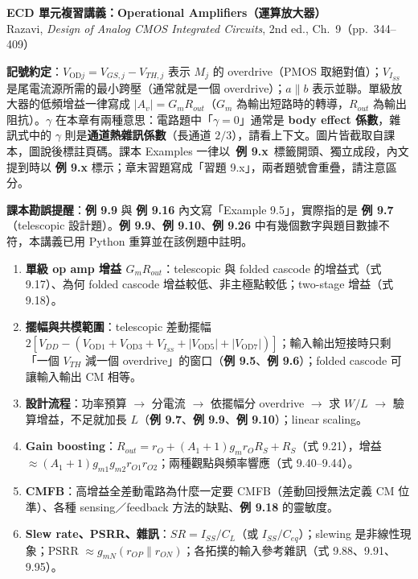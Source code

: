 \documentclass[11pt,a4paper]{article}
\newcommand{\pl}{\mathbin{\|}}
\newcommand{\OD}[1]{V_{\text{OD}#1}}
\newcommand{\extag}[1]{\colorbox{extagbg}{\textcolor{extag}{\sffamily\bfseries\,例 #1\,}}}
\newcommand{\exref}[1]{\textcolor{extag}{\textbf{\sffamily 例 #1}}}
\begin{document}
\begin{center}{\LARGE\bfseries\sffamily ECD 單元複習講義：Operational Amplifiers（運算放大器）}\\[0.3em]{\large Razavi, \emph{Design of Analog CMOS Integrated Circuits}, 2nd ed., Ch.~9（pp.~344--409）}\end{center}

\textbf{記號約定}：$\OD{j}=V_{GS,j}-V_{TH,j}$ 表示 $M_j$ 的 overdrive（PMOS 取絕對值）；$V_{I_{SS}}$ 是尾電流源所需的最小跨壓（通常就是一個 overdrive）；$a\pl b$ 表示並聯。單級放大器的低頻增益一律寫成 $|A_v|=G_mR_{out}$（$G_m$ 為輸出短路時的轉導，$R_{out}$ 為輸出阻抗）。$\gamma$ 在本章有兩種意思：電路題中「$\gamma=0$」通常是 \textbf{body effect 係數}，雜訊式中的 $\gamma$ 則是\textbf{通道熱雜訊係數}（長通道 $2/3$），請看上下文。圖片皆截取自課本，圖說後標註頁碼。課本 Examples 一律以 \extag{9.x} 標籤開頭、獨立成段，內文提到時以 \exref{9.x} 標示；章末習題寫成「習題 9.x」，兩者題號會重疊，請注意區分。

\textbf{課本勘誤提醒}：\exref{9.9} 與 \exref{9.16} 內文寫「Example 9.5」，實際指的是 \exref{9.7}（telescopic 設計題）。\exref{9.9}、\exref{9.10}、\exref{9.26} 中有幾個數字與題目數據不符，本講義已用 Python 重算並在該例題中註明。

\begin{takeaway}[考試重點地圖]
\begin{enumerate}[leftmargin=2.2em]
  \item \textbf{單級 op amp 增益 $G_mR_{out}$}：telescopic 與 folded cascode 的增益式（式 9.17）、為何 folded cascode 增益較低、非主極點較低；two-stage 增益（式 9.18）。
  \item \textbf{擺幅與共模範圍}：telescopic 差動擺幅 $2[V_{DD}-(\OD1+\OD3+V_{I_{SS}}+|\OD5|+|\OD7|)]$；輸入輸出短接時只剩「一個 $V_{TH}$ 減一個 overdrive」的窗口（\exref{9.5}、\exref{9.6}）；folded cascode 可讓輸入輸出 CM 相等。
  \item \textbf{設計流程}：功率預算 $\to$ 分電流 $\to$ 依擺幅分 overdrive $\to$ 求 $W/L$ $\to$ 驗算增益，不足就加長 $L$（\exref{9.7}、\exref{9.9}、\exref{9.10}）；linear scaling。
  \item \textbf{Gain boosting}：$R_{out}=r_O+(A_1+1)g_mr_OR_S+R_S$（式 9.21），增益 $\approx(A_1+1)g_{m1}g_{m2}r_{O1}r_{O2}$；兩種觀點與頻率響應（式 9.40--9.44）。
  \item \textbf{CMFB}：高增益全差動電路為什麼一定要 CMFB（差動回授無法定義 CM 位準）、各種 sensing／feedback 方法的缺點、\exref{9.18} 的靈敏度。
  \item \textbf{Slew rate、PSRR、雜訊}：$SR=I_{SS}/C_L$（或 $I_{SS}/C_{eq}$）；slewing 是非線性現象；PSRR $\approx g_{mN}(r_{OP}\pl r_{ON})$；各拓撲的輸入參考雜訊（式 9.88、9.91、9.95）。
\end{enumerate}
\end{takeaway}
\end{document}
